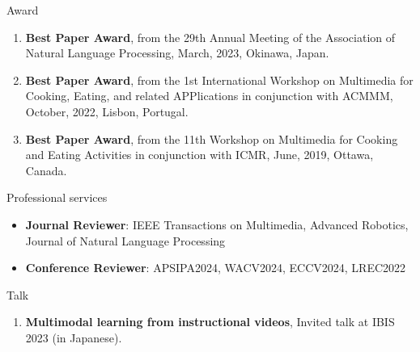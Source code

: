 \begin{rSection}{Award}
\begin{enumerate}
    \item {\bf Best Paper Award}, from the 29th Annual Meeting of the Association of Natural Language Processing, March, 2023, Okinawa, Japan.
    \item {\bf Best Paper Award}, from the 1st International Workshop on Multimedia for Cooking, Eating, and related APPlications in conjunction with ACMMM, October, 2022, Lisbon, Portugal.
    \item {\bf Best Paper Award}, from the 11th Workshop on Multimedia for Cooking and Eating Activities in conjunction with ICMR, June, 2019, Ottawa, Canada.
\end{enumerate}
\end{rSection}

\begin{rSection}{Professional services}
\begin{itemize}
    \item {\bf Journal Reviewer}: IEEE Transactions on Multimedia, Advanced Robotics, Journal of Natural Language Processing
    \item  {\bf Conference Reviewer}: APSIPA2024, WACV2024, ECCV2024, LREC2022
\end{itemize}
\end{rSection}

\begin{rSection}{Talk}
\begin{enumerate}
    \item {\bf Multimodal learning from instructional videos}, Invited talk at IBIS 2023 (in Japanese).
\end{enumerate}
\end{rSection}